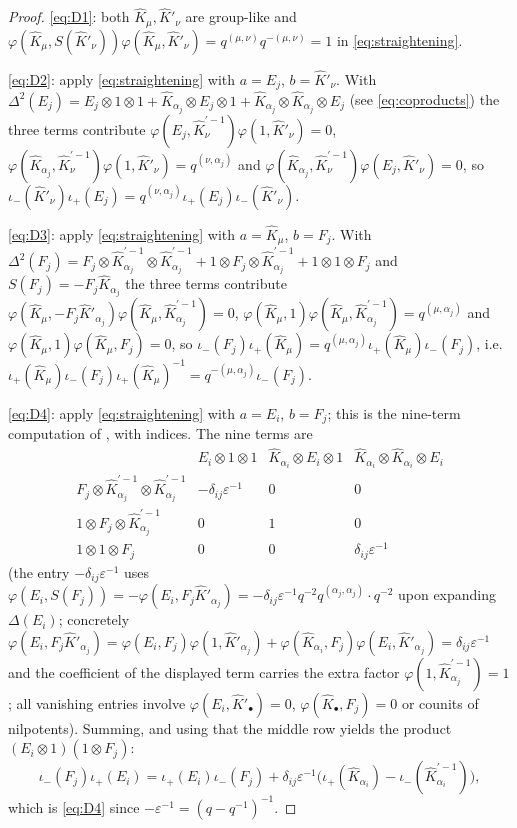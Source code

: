 \documentclass[11pt]{amsart}
\theoremstyle{definition}
\newcommand{\iop}{\iota_{+}}
\newcommand{\iom}{\iota_{-}}
\newcommand{\hK}{\hat K}
\newcommand{\al}{\alpha}
\begin{document}
\begin{proof}
\eqref{eq:D1}: both $\hK_\mu,\hK'_\nu$ are group-like and
$\varphi(\hK_\mu,S(\hK'_\nu))\varphi(\hK_\mu,\hK'_\nu)
=q^{(\mu,\nu)}q^{-(\mu,\nu)}=1$ in \eqref{eq:straightening}.

\eqref{eq:D2}: apply \eqref{eq:straightening} with $a=E_j$,
$b=\hK'_\nu$. With $\Delta^2(E_j)=E_j\otimes1\otimes1
+\hK_{\al_j}\otimes E_j\otimes1+\hK_{\al_j}\otimes\hK_{\al_j}\otimes E_j$
(see \eqref{eq:coproducts}) the three terms contribute
$\varphi(E_j,\hK_\nu^{\prime-1})\varphi(1,\hK'_\nu)=0$,
$\varphi(\hK_{\al_j},\hK_\nu^{\prime-1})\varphi(1,\hK'_\nu)=q^{(\nu,\al_j)}$ and
$\varphi(\hK_{\al_j},\hK_\nu^{\prime-1})\varphi(E_j,\hK'_\nu)=0$, so
$\iom(\hK'_\nu)\iop(E_j)=q^{(\nu,\al_j)}\iop(E_j)\iom(\hK'_\nu)$.

\eqref{eq:D3}: apply \eqref{eq:straightening} with $a=\hK_\mu$, $b=F_j$. With
$\Delta^2(F_j)=F_j\otimes\hK_{\al_j}^{\prime-1}\otimes\hK_{\al_j}^{\prime-1}
+1\otimes F_j\otimes\hK_{\al_j}^{\prime-1}+1\otimes1\otimes F_j$ and
$S(F_j)=-F_j\hK_{\al_j}$ the three terms contribute
$\varphi(\hK_\mu,-F_j\hK'_{\al_j})\varphi(\hK_\mu,\hK_{\al_j}^{\prime-1})=0$,
$\varphi(\hK_\mu,1)\varphi(\hK_\mu,\hK_{\al_j}^{\prime-1})=q^{(\mu,\al_j)}$ and
$\varphi(\hK_\mu,1)\varphi(\hK_\mu,F_j)=0$, so
$\iom(F_j)\iop(\hK_\mu)=q^{(\mu,\al_j)}\iop(\hK_\mu)\iom(F_j)$, i.e.\
$\iop(\hK_\mu)\iom(F_j)\iop(\hK_\mu)^{-1}=q^{-(\mu,\al_j)}\iom(F_j)$.

\eqref{eq:D4}: apply \eqref{eq:straightening} with $a=E_i$, $b=F_j$; this is
the nine-term computation of \cite[\S2, proof of Prop.~2.10]{UvA}, with
indices. The nine terms are
\[
\begin{array}{c|ccc}
 & E_i\otimes1\otimes1 & \hK_{\al_i}\otimes E_i\otimes1 &
 \hK_{\al_i}\otimes\hK_{\al_i}\otimes E_i\\ \hline
F_j\otimes\hK_{\al_j}^{\prime-1}\otimes\hK_{\al_j}^{\prime-1}
& -\delta_{ij}\varepsilon^{-1} & 0 & 0\\
1\otimes F_j\otimes\hK_{\al_j}^{\prime-1} & 0 & 1 & 0\\
1\otimes1\otimes F_j & 0 & 0 & \delta_{ij}\varepsilon^{-1}
\end{array}
\]
(the entry $-\delta_{ij}\varepsilon^{-1}$ uses
$\varphi(E_i,S(F_j))=-\varphi(E_i,F_j\hK'_{\al_j})
=-\delta_{ij}\varepsilon^{-1}q^{-2}q^{(\al_j,\al_j)}\cdot q^{-2}$ upon
expanding $\Delta(E_i)$; concretely
$\varphi(E_i,F_j\hK'_{\al_j})=\varphi(E_i,F_j)\varphi(1,\hK'_{\al_j})
+\varphi(\hK_{\al_i},F_j)\varphi(E_i,\hK'_{\al_j})=\delta_{ij}\varepsilon^{-1}$
and the coefficient of the displayed term carries the extra factor
$\varphi(1,\hK_{\al_j}^{\prime-1})=1$; all vanishing entries involve
$\varphi(E_i,\hK'_\bullet)=0$, $\varphi(\hK_\bullet,F_j)=0$ or counits of
nilpotents). Summing, and using that the middle row yields the product
$(E_i\otimes1)(1\otimes F_j)$:
\[
\iom(F_j)\iop(E_i)=\iop(E_i)\iom(F_j)
+\delta_{ij}\varepsilon^{-1}\big(\iop(\hK_{\al_i})-\iom(\hK_{\al_i}^{\prime-1})\big),
\]
which is \eqref{eq:D4} since $-\varepsilon^{-1}=(q-q^{-1})^{-1}$.
\end{proof}
\end{document}
